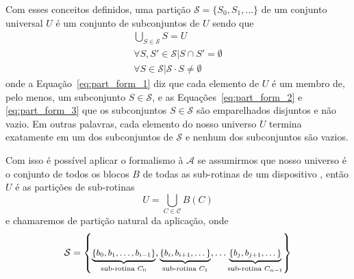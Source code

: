 

         Com esses conceitos definidos, uma partição $ \mathcal{S} = \{S_0, S_1, \dots\} $ de um conjunto universal $ U $ é um conjunto de subconjuntos de $ U $ sendo que
         \begin{gather}
            \bigcup_{S \in \mathcal{S}} S = U \label{eq:part_form_1}\\
            \forall S, S' \in \mathcal{S} | S \cap S' = \emptyset \label{eq:part_form_2}\\
            \forall S \in \mathcal{S} | \mathcal{S} \cdot S \neq \emptyset \label{eq:part_form_3}
         \end{gather}
         onde a Equação~\ref{eq:part_form_1} diz que cada elemento de $ U $ é um membro de, pelo menos, um subconjunto $ S \in \mathcal{S} $, e as Equações~\ref{eq:part_form_2} e \ref{eq:part_form_3} que os subconjuntos $ S \in \mathcal{S} $ são emparelhados disjuntos e não vazio.
         Em outras palavras, cada elemento do nosso universo $ U $ termina exatamente em um dos subconjuntos de $\mathcal{S}$ e nenhum dos subconjuntos são vazios.

         Com isso é possível aplicar o formalismo à $ \mathcal{A} $ se assumirmos que nosso universo é o conjunto de todos os blocos $B$ de todas as sub-rotinas de um dispositivo \wearable, então $U$ é as partições de sub-rotinas
         \begin{equation}
            U = \bigcup_{C \in \mathcal{C}} B(C) \label{eq:bigcup}
         \end{equation}
         e chamaremos de partição natural da aplicação, onde
         \begin{equation} \small
            \mathcal{S}  = \left \{
            \underbrace{\left \{ b_0, b_1, \dots, b_{i-1} \right \}}_{\textnormal{sub-rotina }C_0},
            \underbrace{\left \{ b_i, b_{i+1}, \dots \right \}}_{\textnormal{sub-rotina }C_1},\dots
            \underbrace{\left \{ b_j, b_{j+1}, \dots \right \}}_{\textnormal{sub-rotina }C_{n-1}}
            \right \}
         \end{equation}


